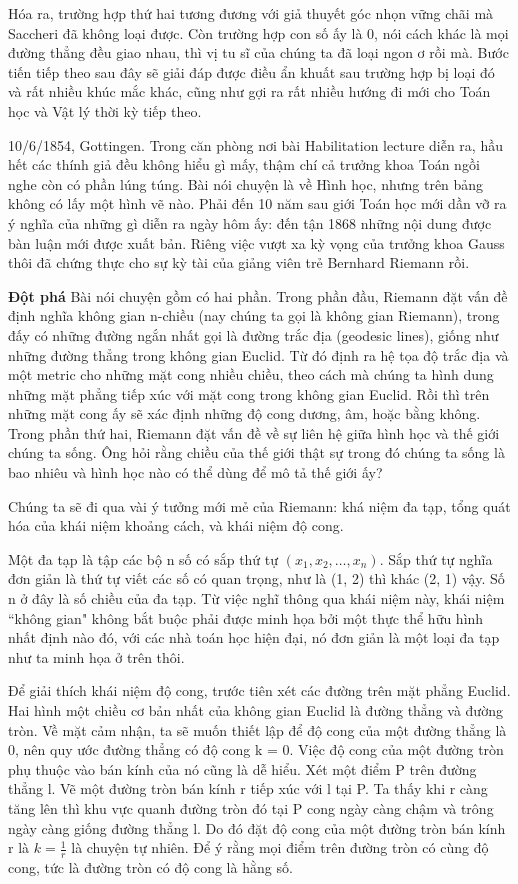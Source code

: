 \begin{multicols}{2}
	Hóa ra, trường hợp thứ hai tương đương với giả thuyết góc nhọn vững chãi mà Saccheri đã không loại được. Còn trường hợp con số ấy là 0, nói cách khác là mọi đường thẳng đều giao nhau, thì vị tu sĩ của chúng ta đã loại ngon ơ rồi mà. 
	Bước tiến tiếp theo sau đây sẽ giải đáp được điều ẩn khuất sau trường hợp bị loại đó và rất nhiều khúc mắc khác, cũng như gợi ra rất nhiều hướng đi mới cho Toán học và Vật lý thời kỳ tiếp theo.  
	
	10/6/1854, Gottingen. Trong căn phòng nơi bài Habilitation lecture diễn ra, hầu hết các thính giả đều không hiểu gì mấy, thậm chí cả trưởng khoa Toán ngồi nghe còn có phần lúng túng. Bài nói chuyện là về Hình học, nhưng trên bảng không có lấy một hình vẽ nào. Phải đến 10 năm sau giới Toán học mới dần vỡ ra ý nghĩa của những gì diễn ra ngày hôm ấy: đến tận 1868 những nội dung được bàn luận mới được xuất bản. Riêng việc vượt xa kỳ vọng của trưởng khoa Gauss thôi đã chứng thực cho sự kỳ tài của giảng viên trẻ Bernhard Riemann rồi.
	
	\textbf{\color{lichsutoanhoc}Đột phá}
	Bài nói chuyện gồm có hai phần.
	Trong phần đầu, Riemann đặt vấn đề định nghĩa không gian n-chiều (nay chúng ta gọi là không gian Riemann), trong đấy có những đường ngắn nhất gọi là đường trắc địa (geodesic lines), giống như những đường thẳng trong không gian Euclid. Từ đó định ra hệ tọa độ trắc địa và một metric cho những mặt cong nhiều chiều, theo cách mà chúng ta hình dung những mặt phẳng tiếp xúc với mặt cong trong không gian Euclid. Rồi thì trên những mặt cong ấy sẽ xác định những độ cong dương, âm, hoặc bằng không.
	Trong phần thứ hai, Riemann đặt vấn đề về sự liên hệ giữa hình học và thế giới chúng ta sống. Ông hỏi rằng chiều của thế giới thật sự trong đó chúng ta sống là bao nhiêu và hình học nào có thể dùng để mô tả thế giới ấy?
	
	
	Chúng ta sẽ đi qua vài ý tưởng mới mẻ của Riemann: khá niệm đa tạp, tổng quát hóa của khái niệm khoảng cách, và khái niệm độ cong. 
	
	Một đa tạp là tập các bộ n số có sắp thứ tự $(x_1, x_2, …, x_n)$. Sắp thứ tự nghĩa đơn giản là thứ tự viết các số có quan trọng, như là (1, 2) thì khác (2, 1) vậy. Số n ở đây là số chiều của đa tạp. Từ việc nghĩ thông qua khái niệm này, khái niệm ``không gian" không bắt buộc phải được minh họa bởi một thực thể hữu hình nhất định nào đó, với các nhà toán học hiện đại, nó đơn giản là một loại đa tạp như ta minh họa ở trên thôi. 
	
	
	Để giải thích khái niệm độ cong, trước tiên xét các đường trên mặt phẳng Euclid. Hai hình một chiều cơ bản nhất của không gian Euclid là đường thẳng và đường tròn. Về mặt cảm nhận, ta sẽ muốn thiết lập để độ cong của một đường thẳng là 0, nên quy ước đường thẳng có độ cong k = 0. Việc độ cong của một đường tròn phụ thuộc vào bán kính của nó cũng là dễ hiểu. Xét một điểm P trên đường thẳng l. Vẽ một đường tròn bán kính r tiếp xúc với l tại P. Ta thấy khi r càng tăng lên thì khu vực quanh đường tròn đó tại P cong ngày càng chậm và trông ngày càng giống đường thẳng l. Do đó đặt độ cong của một đường tròn bán kính r là $k = \frac{1}{r}$ là chuyện tự nhiên. Để ý rằng mọi điểm trên đường tròn có cùng độ cong, tức là đường tròn có độ cong là hằng số.
	

\end{multicols}
